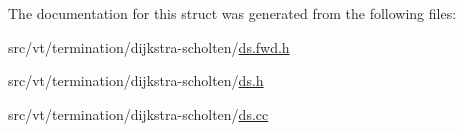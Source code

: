 The documentation for this struct was generated from the following files\+:\begin{DoxyCompactItemize}
\item 
src/vt/termination/dijkstra-\/scholten/\hyperlink{ds_8fwd_8h}{ds.\+fwd.\+h}\item 
src/vt/termination/dijkstra-\/scholten/\hyperlink{ds_8h}{ds.\+h}\item 
src/vt/termination/dijkstra-\/scholten/\hyperlink{ds_8cc}{ds.\+cc}\end{DoxyCompactItemize}
